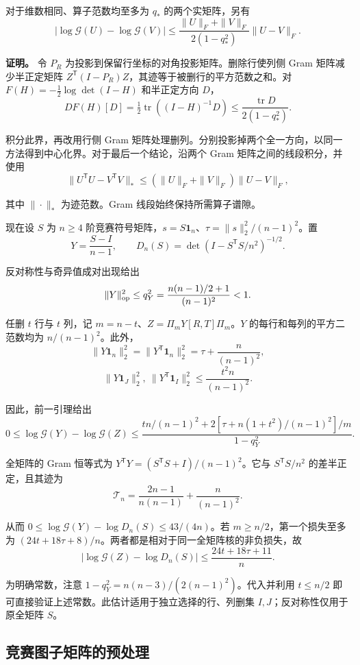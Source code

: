 \documentclass[11pt,a4paper]{article}
\begin{document}
对于维数相同、算子范数均至多为 \(q_*\) 的两个实矩阵，另有
\[|\log\mathcal G(U)-\log\mathcal G(V)|\le\frac{\|U\|_F+\|V\|_F}{2(1-q_*^2)}\|U-V\|_F.\]

\textbf{证明。} 令 \(P_R\) 为投影到保留行坐标的对角投影矩阵。删除行使列侧 Gram 矩阵减少半正定矩阵 \(Z^{\mathsf T}(I-P_R)Z\)，其迹等于被删行的平方范数之和。对 \(F(H)=-\tfrac12\log\det(I-H)\) 和半正定方向 \(D\)，
\[DF(H)[D]=\tfrac12\operatorname{tr}((I-H)^{-1}D)\le\frac{\operatorname{tr}D}{2(1-q_*^2)}.\]

积分此界，再改用行侧 Gram 矩阵处理删列。分别投影掉两个全一方向，以同一方法得到中心化界。对于最后一个结论，沿两个 Gram 矩阵之间的线段积分，并使用
\[\|U^{\mathsf T}U-V^{\mathsf T}V\|_*\le(\|U\|_F+\|V\|_F)\|U-V\|_F,\]

其中 \(\|\cdot\|_*\) 为迹范数。Gram 线段始终保持所需算子谱隙。

现在设 \(S\) 为 \(n\ge4\) 阶竞赛符号矩阵，\(s=S\mathbf 1_n\)、\(\tau=\|s\|_2^2/(n-1)^2\)。置
\[Y=\frac{S-I}{n-1},\qquad D_n(S)=\det(I-S^{\mathsf T}S/n^2)^{-1/2}.\]

反对称性与奇异值成对出现给出
\[\|Y\|_{\rm op}^2\le q_Y^2=\frac{n(n-1)/2+1}{(n-1)^2}<1.\]

任删 \(t\) 行与 \(t\) 列，记 \(m=n-t\)、\(Z=\Pi_mY[R,T]\Pi_m\)。\(Y\) 的每行和每列的平方二范数均为 \(n/(n-1)^2\)。此外，
\[\|Y\mathbf 1_n\|_2^2=\|Y^{\mathsf T}\mathbf 1_n\|_2^2=\tau+\frac n{(n-1)^2},\]
\nopagebreak[3]\[\|Y\mathbf 1_J\|_2^2,\ \|Y^{\mathsf T}\mathbf 1_I\|_2^2\le\frac{t^2n}{(n-1)^2}.\]

因此，前一引理给出
\[0\le\log\mathcal G(Y)-\log\mathcal G(Z)\le\frac{t n/(n-1)^2+2[\tau+n(1+t^2)/(n-1)^2]/m}{1-q_Y^2}.\]

全矩阵的 Gram 恒等式为 \(Y^{\mathsf T}Y=(S^{\mathsf T}S+I)/(n-1)^2\)。它与 \(S^{\mathsf T}S/n^2\) 的差半正定，且其迹为
\[\mathcal T_n=\frac{2n-1}{n(n-1)}+\frac n{(n-1)^2}.\]

从而 \(0\le\log\mathcal G(Y)-\log D_n(S)\le43/(4n)\)。若 \(m\ge n/2\)，第一个损失至多为 \((24t+18\tau+8)/n\)。两者都是相对于同一全矩阵核的非负损失，故
\[|\log\mathcal G(Z)-\log D_n(S)|\le\frac{24t+18\tau+11}{n}.\]

为明确常数，注意 \(1-q_Y^2=n(n-3)/(2(n-1)^2)\)。代入并利用 \(t\le n/2\) 即可直接验证上述常数。此估计适用于独立选择的行、列删集 \(I,J\)；反对称性仅用于原全矩阵 \(S\)。

\subsection{竞赛图子矩阵的预处理}\label{sec-6.3}
\end{document}
